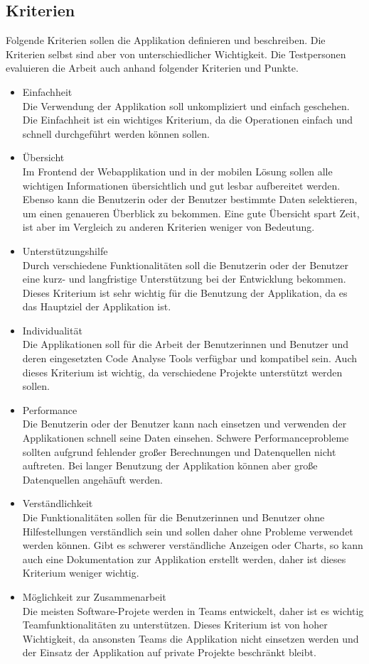 \subsection{Kriterien} 
Folgende Kriterien sollen die Applikation definieren und beschreiben. Die Kriterien selbst sind aber von unterschiedlicher Wichtigkeit. Die Testpersonen evaluieren die Arbeit auch anhand folgender Kriterien und Punkte.
\begin{itemize}
\item Einfachheit \\ Die Verwendung der Applikation soll unkompliziert und einfach geschehen. Die Einfachheit ist ein wichtiges Kriterium, da die Operationen einfach und schnell durchgeführt werden können sollen.
\item Übersicht \\ Im Frontend der Webapplikation und in der mobilen Lösung sollen alle wichtigen Informationen übersichtlich und gut lesbar aufbereitet werden. Ebenso kann die Benutzerin oder der Benutzer bestimmte Daten selektieren, um einen genaueren Überblick zu bekommen. Eine gute Übersicht spart Zeit, ist aber im Vergleich zu anderen Kriterien weniger von Bedeutung.
\item Unterstützungshilfe \\ Durch verschiedene Funktionalitäten soll die Benutzerin oder der Benutzer eine kurz- und langfristige Unterstützung bei der Entwicklung bekommen. Dieses Kriterium ist sehr wichtig für die Benutzung der Applikation, da es das Hauptziel der Applikation ist.
\item Individualität \\ Die Applikationen soll für die Arbeit der Benutzerinnen und Benutzer und deren eingesetzten Code Analyse Tools verfügbar und kompatibel sein. Auch dieses Kriterium ist wichtig, da verschiedene Projekte unterstützt werden sollen.
\item Performance \\ Die Benutzerin oder der Benutzer kann nach einsetzen und verwenden der Applikationen schnell seine Daten einsehen. Schwere Performanceprobleme sollten aufgrund fehlender großer Berechnungen und Datenquellen nicht auftreten. Bei langer Benutzung der Applikation können aber große Datenquellen angehäuft werden.
\item Verständlichkeit \\ Die Funktionalitäten sollen für die Benutzerinnen und Benutzer ohne Hilfestellungen verständlich sein und sollen daher ohne Probleme verwendet werden können. Gibt es schwerer verständliche Anzeigen oder Charts, so kann auch eine Dokumentation zur Applikation erstellt werden, daher ist dieses Kriterium weniger wichtig.
\item Möglichkeit zur Zusammenarbeit \\
Die meisten Software-Projete werden in Teams entwickelt, daher ist es wichtig Teamfunktionalitäten zu unterstützen. Dieses Kriterium  ist von hoher Wichtigkeit, da ansonsten Teams die Applikation nicht einsetzen werden und der Einsatz der Applikation auf private Projekte beschränkt bleibt.
\end{itemize}

